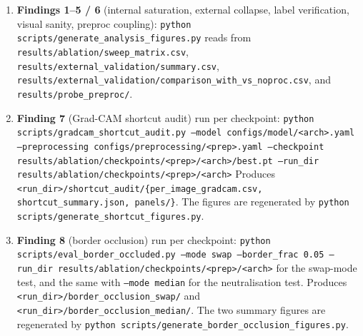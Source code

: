\documentclass[11pt]{article}
\begin{document}
\begin{enumerate}
  \item \textbf{Findings 1--5 / 6} (internal saturation, external
        collapse, label verification, visual sanity, preproc coupling):
        \texttt{python scripts/generate\_analysis\_figures.py}
        reads from \texttt{results/ablation/sweep\_matrix.csv},
        \texttt{results/external\_validation/summary.csv},
        \texttt{results/external\_validation/comparison\_with\_vs\_noproc.csv},
        and \texttt{results/probe\_preproc/}.

  \item \textbf{Finding 7} (Grad-CAM shortcut audit) run per checkpoint:
        \texttt{python scripts/gradcam\_shortcut\_audit.py
        --model configs/model/<arch>.yaml
        --preprocessing configs/preprocessing/<prep>.yaml
        --checkpoint results/ablation/checkpoints/<prep>/<arch>/best.pt
        --run\_dir results/ablation/checkpoints/<prep>/<arch>}
        Produces \texttt{<run\_dir>/shortcut\_audit/\{per\_image\_gradcam.csv,
        shortcut\_summary.json, panels/\}}.
        The figures are regenerated by
        \texttt{python scripts/generate\_shortcut\_figures.py}.

  \item \textbf{Finding 8} (border occlusion) run per checkpoint:
        \texttt{python scripts/eval\_border\_occluded.py --mode swap
        --border\_frac 0.05 --run\_dir results/ablation/checkpoints/<prep>/<arch>}
        for the swap-mode test, and the same with \texttt{--mode median}
        for the neutralisation test. Produces
        \texttt{<run\_dir>/border\_occlusion\_swap/} and
        \texttt{<run\_dir>/border\_occlusion\_median/}. The two summary
        figures are regenerated by
        \texttt{python scripts/generate\_border\_occlusion\_figures.py}.


\end{enumerate}
\end{document}
